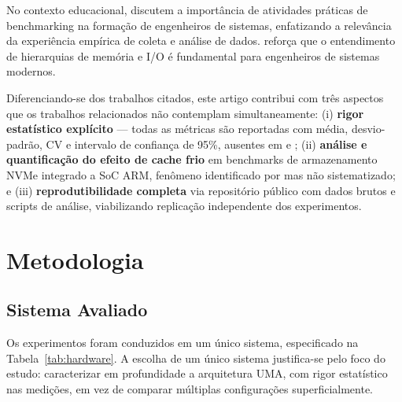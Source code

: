 \documentclass[12pt]{article}
\begin{document}
No contexto educacional, \cite{silva2019ensino} discutem a import\^ancia de
atividades pr\'aticas de benchmarking na forma\c{c}\~ao de engenheiros de
sistemas, enfatizando a relev\^ancia da experi\^encia emp\'irica de coleta
e an\'alise de dados. \cite{stallings2016computer} refor\c{c}a que o
entendimento de hierarquias de mem\'oria e I/O \'e fundamental para
engenheiros de sistemas modernos.

Diferenciando-se dos trabalhos citados, este artigo contribui com tr\^es
aspectos que os trabalhos relacionados n\~ao contemplam simultaneamente:
(i) \textbf{rigor estat\'istico expl\'icito} --- todas as m\'etricas s\~ao
reportadas com m\'edia, desvio-padr\~ao, CV e intervalo de confian\c{c}a
de 95\%, ausentes em \cite{lim2022apple} e \cite{truong2022performance};
(ii) \textbf{an\'alise e quantifica\c{c}\~ao do efeito de cache frio} em
benchmarks de armazenamento NVMe integrado a SoC ARM, fen\^omeno identificado
por \cite{yang2020empirical} mas n\~ao sistematizado; e (iii)
\textbf{reprodutibilidade completa} via reposit\'orio p\'ublico com dados
brutos e scripts de an\'alise, viabilizando replica\c{c}\~ao independente
dos experimentos.


\section{Metodologia}

\subsection{Sistema Avaliado}

Os experimentos foram conduzidos em um \'unico sistema, especificado na
Tabela~\ref{tab:hardware}. A escolha de um \'unico sistema justifica-se pelo
foco do estudo: caracterizar em profundidade a arquitetura UMA, com rigor
estat\'istico nas medi\c{c}\~oes, em vez de comparar m\'ultiplas
configura\c{c}\~oes superficialmente.
\end{document}
